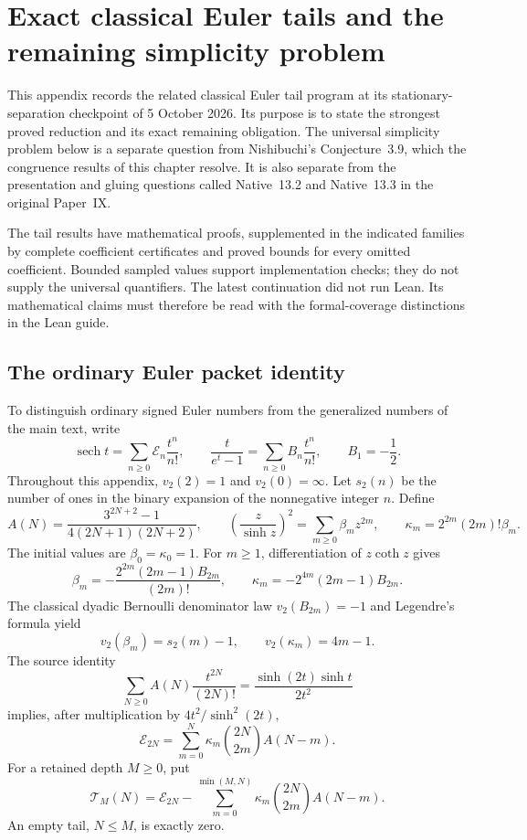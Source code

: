 \section{Exact classical Euler tails and the remaining simplicity problem}
\label{app:root:scope}

This appendix records the related classical Euler tail program at its
stationary-separation checkpoint of 5 October 2026. Its purpose is to state
the strongest proved reduction and its exact remaining obligation. The
universal simplicity problem below is a separate question from
Nishibuchi's Conjecture~3.9, which the congruence results of this chapter
resolve. It is also separate from the presentation and gluing questions
called Native~13.2 and Native~13.3 in the original Paper~IX.

The tail results have mathematical proofs, supplemented in the indicated
families by complete coefficient certificates and proved bounds for every
omitted coefficient. Bounded sampled values support implementation checks;
they do not supply the universal quantifiers. The latest continuation did
not run Lean. Its mathematical claims must therefore be read with the
formal-coverage distinctions in the Lean guide.

\subsection{The ordinary Euler packet identity}
\label{app:root:identity}

To distinguish ordinary signed Euler numbers from the generalized numbers
of the main text, write
\[
 \operatorname{sech}t=\sum_{n\ge0}\mathcal E_n\frac{t^n}{n!},
 \qquad \frac{t}{e^t-1}=\sum_{n\ge0}B_n\frac{t^n}{n!},
 \qquad B_1=-\frac12.
\]
Throughout this appendix, $v_2(2)=1$ and $v_2(0)=\infty$.
Let $s_2(n)$ be the number of ones in the binary expansion of the
nonnegative integer $n$. Define
\[
 A(N)=\frac{3^{2N+2}-1}{4(2N+1)(2N+2)},\qquad
 \left(\frac z{\sinh z}\right)^2=\sum_{m\ge0}\beta_m z^{2m},
 \qquad \kappa_m=2^{2m}(2m)!\beta_m.
\]
The initial values are $\beta_0=\kappa_0=1$. For $m\ge1$, differentiation
of $z\coth z$ gives
\begin{equation}
 \beta_m=-\frac{2^{2m}(2m-1)B_{2m}}{(2m)!},\qquad
 \kappa_m=-2^{4m}(2m-1)B_{2m}.
 \label{eq:root:beta}
\end{equation}
The classical dyadic Bernoulli denominator law
$v_2(B_{2m})=-1$ and Legendre's formula yield
\begin{equation}
 v_2(\beta_m)=s_2(m)-1,\qquad
 v_2(\kappa_m)=4m-1.\label{eq:root:weights}
\end{equation}
The source identity
\[
 \sum_{N\ge0}A(N)\frac{t^{2N}}{(2N)!}
 =\frac{\sinh(2t)\sinh t}{2t^2}
\]
implies, after multiplication by $4t^2/\sinh^2(2t)$,
\begin{equation}
 \mathcal E_{2N}=\sum_{m=0}^N
    \kappa_m\binom{2N}{2m}A(N-m).
 \label{eq:root:packet}
\end{equation}
For a retained depth $M\ge0$, put
\[
 \mathcal T_M(N)=\mathcal E_{2N}
   -\sum_{m=0}^{\min(M,N)}\kappa_m\binom{2N}{2m}A(N-m).
\]
An empty tail, $N\le M$, is exactly zero.

